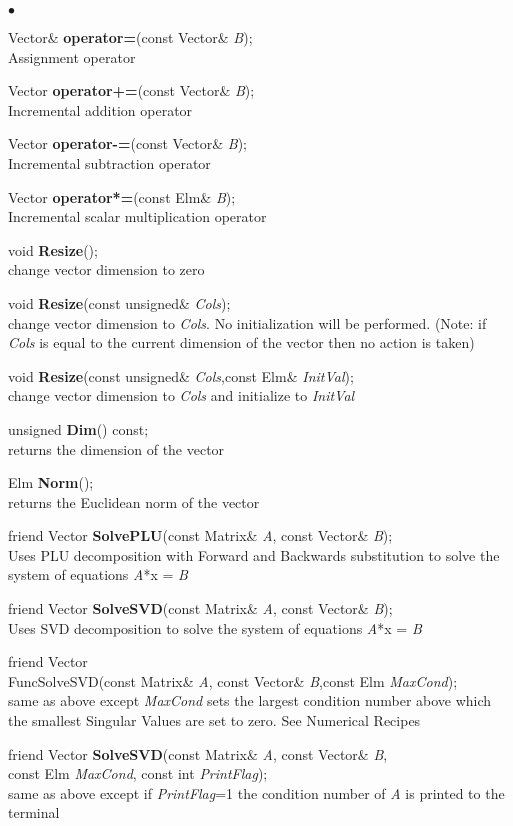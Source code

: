 \documentclass{article}
\newcommand{\Func}[1]{\textbf{#1}}
\newcommand{\var}[1]{\textit{#1}}
\newenvironment{LIST}{\begin{list}{$\bullet$}{%
      \setlength{\leftmargin}{2\leftmargin}%
      \setlength{\itemindent}{-1cm}}}%
  {\end{list}}
\begin{document}
\begin{LIST}
 \item Vector\& \Func{operator=}(const Vector\& \var{B});\\
  Assignment operator
 \item Vector \Func{operator+=}(const Vector\& \var{B});\\
  Incremental addition operator
 \item Vector \Func{operator-=}(const Vector\& \var{B});\\
  Incremental subtraction operator
 \item Vector \Func{operator*=}(const Elm\& \var{B});\\
  Incremental scalar multiplication operator \\[.5cm]

 \item void \Func{Resize}();\\
  change vector dimension to zero
 \item void \Func{Resize}(const unsigned\& \var{Cols});\\
  change vector dimension to \var{Cols}.  No initialization will be performed.
  (Note: if \var{Cols} is equal to the current dimension of the vector then no
  action is taken)
 \item void \Func{Resize}(const unsigned\& \var{Cols},const Elm\& \var{InitVal});\\
  change vector dimension to \var{Cols} and initialize to \var{InitVal}\\[.5cm]

 \item unsigned \Func{Dim}() const;\\
  returns the dimension of the vector
 \item Elm \Func{Norm}();\\
  returns the Euclidean norm of the vector\\[.5cm]
  
 \item friend Vector \Func{SolvePLU}(const Matrix\& \var{A},
  const Vector\& \var{B});\\
  Uses PLU decomposition with Forward and Backwards substitution to solve the
  system of equations \var{A}*x = \var{B}
 \item friend Vector \Func{SolveSVD}(const Matrix\& \var{A},
  const Vector\& \var{B});\\
  Uses SVD decomposition to solve the system of equations \var{A}*x = \var{B}
 \item friend Vector \\Func{SolveSVD}(const Matrix\& \var{A},
  const Vector\& \var{B},const Elm \var{MaxCond});\\
  same as above except \var{MaxCond} sets the largest condition number above
  which the smallest Singular Values are set to zero.  See Numerical Recipes
 \item friend Vector \Func{SolveSVD}(const Matrix\& \var{A},
  const Vector\& \var{B},\\const Elm \var{MaxCond}, const int \var{PrintFlag});\\
  same as above except if \var{PrintFlag}=1 the condition number of \var{A}
  is printed to the terminal \\[.5cm]
  


\end{LIST}
\end{document}
